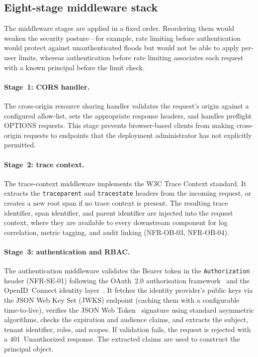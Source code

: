 \documentclass[a4paper,noexaminfo]{sapthesis}
\begin{document}
\subsection{Eight-stage middleware stack}

The middleware stages are applied in a fixed order.  Reordering them
would weaken the security posture---for example, rate limiting before
authentication would protect against unauthenticated floods but would
not be able to apply per-user limits, whereas authentication before rate
limiting associates each request with a known principal before the limit
check.

\paragraph{Stage~1: CORS handler.}
The cross-origin resource sharing handler validates the request's origin
against a configured allow-list, sets the appropriate response headers,
and handles preflight OPTIONS requests.  This stage prevents browser-based
clients from making cross-origin requests to endpoints that the deployment
administrator has not explicitly permitted.

\paragraph{Stage~2: trace context.}
The trace-context middleware implements the W3C Trace Context standard.  It
extracts the \texttt{traceparent} and \texttt{tracestate} headers from the
incoming request, or creates a new root span if no trace context is
present.  The resulting trace identifier, span identifier, and parent
identifier are injected into the request context, where they are available
to every downstream component for log correlation, metric tagging, and
audit linking (NFR-OB-03, NFR-OB-04).

\paragraph{Stage~3: authentication and RBAC.}
The authentication middleware validates the Bearer token in the
\texttt{Authorization} header (NFR-SE-01) following the OAuth~2.0
authorisation framework~\cite{rfc6749oauth2} and the OpenID~Connect
identity layer~\cite{oidc2014}.  It fetches the identity provider's
public keys via the JSON Web Key Set (JWKS) endpoint (caching them with
a configurable time-to-live), verifies the JSON Web
Token~\cite{rfc7519jwt} signature using standard asymmetric algorithms,
checks the expiration and audience claims, and extracts the subject,
tenant identifier, roles, and scopes.  If validation fails, the request is
rejected with a 401~Unauthorized response.  The extracted claims are used
to construct the principal object.
\end{document}
